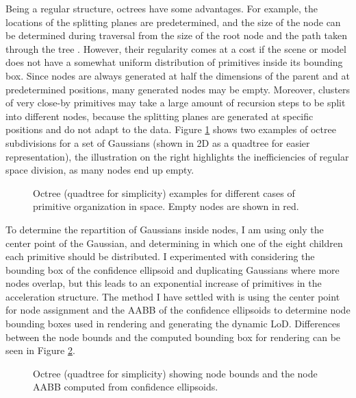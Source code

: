 Being a regular structure, octrees have some advantages. For example, the locations of the splitting planes are predetermined, and the size of the node can be determined during traversal from the size of the root node and the path taken through the tree \cite{RTR4}. However, their regularity comes at a cost if the scene or model does not have a somewhat uniform distribution of primitives inside its bounding box. Since nodes are always generated at half the dimensions of the parent and at predetermined positions, many generated nodes may be empty. Moreover, clusters of very close-by primitives may take a large amount of recursion steps to be split into different nodes, because the splitting planes are generated at specific positions and do not adapt to the data. Figure \ref{fig:octree_diff} shows two examples of octree subdivisions for a set of Gaussians (shown in 2D as a quadtree for easier representation), the illustration on the right highlights the inefficiencies of regular space division, as many nodes end up empty.

\begin{figure}[H]
    \centering
    
    \caption{Octree (quadtree for simplicity) examples for different cases of primitive organization in space. Empty nodes are shown in red.}
    \label{fig:octree_diff}
\end{figure}

To determine the repartition of Gaussians inside nodes, I am using only the center point of the Gaussian, and determining in which one of the eight children each primitive should be distributed. I experimented with considering the bounding box of the confidence ellipsoid and duplicating Gaussians where more nodes overlap, but this leads to an exponential increase of primitives in the acceleration structure. The method I have settled with is using the center point for node assignment and the AABB of the confidence ellipsoids to determine node bounding boxes used in rendering and generating the dynamic LoD. Differences between the node bounds and the computed bounding box for rendering can be seen in Figure \ref{fig:octree_bbox}.

\begin{figure}[H]
    \centering
    
    \caption{Octree (quadtree for simplicity) showing node bounds and the node AABB computed from confidence ellipsoids.}
    \label{fig:octree_bbox}
\end{figure}

